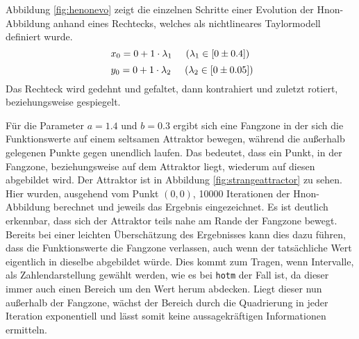 Abbildung \ref{fig:henonevo} zeigt die einzelnen Schritte einer Evolution der H\e non-Abbildung anhand eines Rechtecks, welches als nichtlineares Taylormodell definiert wurde.
$$x_0 = 0 + 1 \cdot \lambda_1 \hspace{.5cm} (\lambda_1 \in [0 \pm 0.4])$$
$$\ y_0 = 0 + 1 \cdot \lambda_2 \hspace{.5cm} (\lambda_2 \in [0 \pm 0.05])$$
Das Rechteck wird gedehnt und gefaltet, dann kontrahiert und zuletzt rotiert, beziehungsweise gespiegelt. 


Für die Parameter $a=1.4$ und $b=0.3$ ergibt sich eine Fangzone in der sich die Funktionswerte auf einem seltsamen Attraktor bewegen, während die außerhalb gelegenen Punkte gegen unendlich laufen. Das bedeutet, dass ein Punkt, in der Fangzone, beziehungsweise auf dem Attraktor liegt, wiederum auf diesen abgebildet wird. Der Attraktor ist in Abbildung \ref{fig:strangeattractor} zu sehen. Hier wurden, ausgehend vom Punkt $(0,0)$, 10000 Iterationen der H\e non-Abbildung berechnet und jeweils das Ergebnis eingezeichnet. Es ist deutlich erkennbar, dass sich der Attraktor teils nahe am Rande der Fangzone bewegt. Bereits bei einer leichten Überschätzung des Ergebnisses kann dies dazu führen, dass die Funktionswerte die Fangzone verlassen, auch wenn der tatsächliche Wert eigentlich in dieselbe abgebildet würde. Dies kommt zum Tragen, wenn Intervalle, als Zahlendarstellung gewählt werden, wie es bei \verb+hotm+ der Fall ist, da dieser immer auch einen Bereich um den Wert herum abdecken. Liegt dieser nun außerhalb der Fangzone, wächst der Bereich durch die Quadrierung in jeder Iteration exponentiell und lässt somit keine aussagekräftigen Informationen ermitteln.






